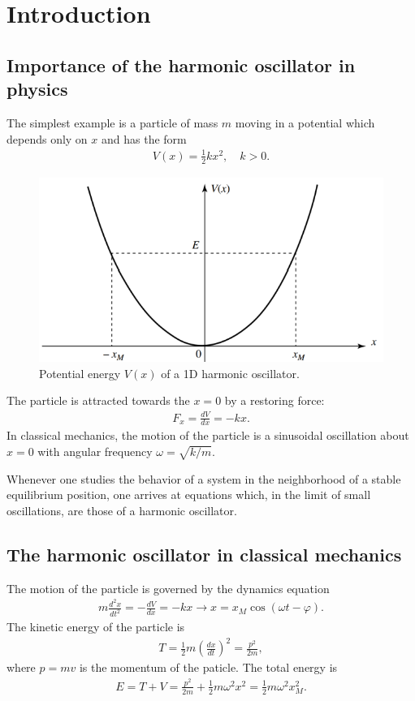 \section{Introduction}
\subsection{Importance of the harmonic oscillator in physics}
The simplest example is a particle of mass $m$ moving in a potential which depends only on $x$ and has the form 
\begin{align*}
    V(x)=\frac{1}{2}kx^2,\quad k>0.
\end{align*}
\begin{figure}[h!]
    \centering
    \includegraphics[width=.5\columnwidth]{PartOne/ChapterThree/potentialharmonicoscillator.png}
    \caption{Potential energy $V(x)$ of a 1D harmonic oscillator.}
\end{figure}
The particle is attracted towards the $x=0$ by a restoring force:
\begin{align*}
    F_x=\frac{dV}{dx}=-kx.
\end{align*}
In classical mechanics, the motion of the particle is a sinusoidal oscillation about $x=0$ with angular frequency $\omega=\sqrt{k/m}$.

\begin{emphasizer}
    Whenever one studies the behavior of a system in the neighborhood of a stable equilibrium position, one arrives at equations which, 
    in the limit of small oscillations, are those of a harmonic oscillator.
\end{emphasizer}
\subsection{The harmonic oscillator in classical mechanics}
The motion of the particle is governed by the dynamics equation
\begin{align}
    m\frac{d^2x}{dt^2}=-\frac{dV}{dx}=-kx\longrightarrow x=x_M\cos(\omega t-\varphi).
\end{align}
The kinetic energy of the particle is 
\begin{align}
    T=\frac{1}{2}m\left(\frac{dx}{dt}\right)^2=\frac{p^2}{2m},
\end{align}
where $p=mv$ is the momentum of the paticle. The total energy is 
\begin{align*}
    E=T+V=\frac{p^2}{2m}+\frac{1}{2}m\omega^2x^2=\frac{1}{2}m\omega^2x^2_M.
\end{align*}

